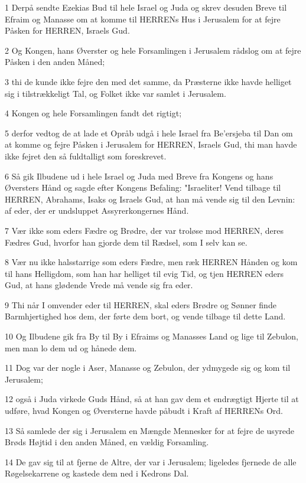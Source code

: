 \par 1 Derpå sendte Ezekias Bud til hele Israel og Juda og skrev desuden Breve til Efraim og Manasse om at komme til HERRENs Hus i Jerusalem for at fejre Påsken for HERREN, Israels Gud.
\par 2 Og Kongen, hans Øverster og hele Forsamlingen i Jerusalem rådslog om at fejre Påsken i den anden Måned;
\par 3 thi de kunde ikke fejre den med det samme, da Præsterne ikke havde helliget sig i tilstrækkeligt Tal, og Folket ikke var samlet i Jerusalem.
\par 4 Kongen og hele Forsamlingen fandt det rigtigt;
\par 5 derfor vedtog de at lade et Opråb udgå i hele Israel fra Be'ersjeba til Dan om at komme og fejre Påsken i Jerusalem for HERREN, Israels Gud, thi man havde ikke fejret den så fuldtalligt som foreskrevet.
\par 6 Så gik Ilbudene ud i hele Israel og Juda med Breve fra Kongens og hans Øversters Hånd og sagde efter Kongens Befaling: "Israeliter! Vend tilbage til HERREN, Abrahams, Isaks og Israels Gud, at han må vende sig til den Levnin: af eder, der er undsluppet Assyrerkongernes Hånd.
\par 7 Vær ikke som eders Fædre og Brødre, der var troløse mod HERREN, deres Fædres Gud, hvorfor han gjorde dem til Rædsel, som I selv kan se.
\par 8 Vær nu ikke halsstarrige som eders Fædre, men ræk HERREN Hånden og kom til hans Helligdom, som han har helliget til evig Tid, og tjen HERREN eders Gud, at hans glødende Vrede må vende sig fra eder.
\par 9 Thi når I omvender eder til HERREN, skal eders Brødre og Sønner finde Barmhjertighed hos dem, der førte dem bort, og vende tilbage til dette Land.
\par 10 Og Ilbudene gik fra By til By i Efraims og Manasses Land og lige til Zebulon, men man lo dem ud og hånede dem.
\par 11 Dog var der nogle i Aser, Manasse og Zebulon, der ydmygede sig og kom til Jerusalem;
\par 12 også i Juda virkede Guds Hånd, så at han gav dem et endrægtigt Hjerte til at udføre, hvad Kongen og Øversterne havde påbudt i Kraft af HERRENs Ord.
\par 13 Så samlede der sig i Jerusalem en Mængde Mennesker for at fejre de usyrede Brøds Højtid i den anden Måned, en vældig Forsamling.
\par 14 De gav sig til at fjerne de Altre, der var i Jerusalem; ligeledes fjernede de alle Røgelsekarrene og kastede dem ned i Kedrons Dal.
